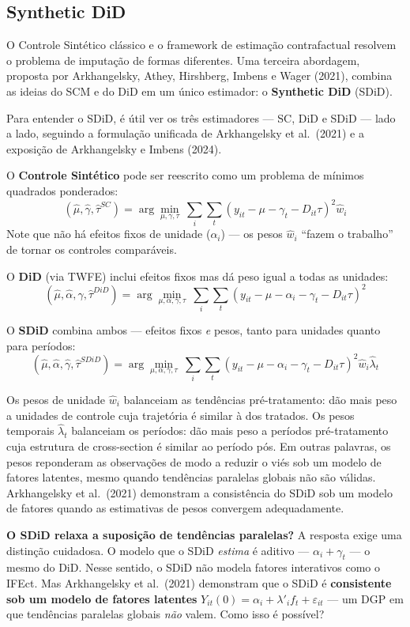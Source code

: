 \documentclass[
]{article}
\begin{document}
\subsection{Synthetic DiD}\label{synthetic-did}

O Controle Sintético clássico e o framework de estimação contrafactual resolvem o problema de imputação de formas diferentes. Uma terceira abordagem, proposta por Arkhangelsky, Athey, Hirshberg, Imbens e Wager (2021), combina as ideias do SCM e do DiD em um único estimador: o \textbf{Synthetic DiD} (SDiD).

Para entender o SDiD, é útil ver os três estimadores --- SC, DiD e SDiD --- lado a lado, seguindo a formulação unificada de Arkhangelsky et al.~(2021) e a exposição de Arkhangelsky e Imbens (2024).

O \textbf{Controle Sintético} pode ser reescrito como um problema de mínimos quadrados ponderados:
\[
(\hat{\mu}, \hat{\gamma}, \hat{\tau}^{SC}) = \arg\min_{\mu, \gamma, \tau}\ \sum_i \sum_t (y_{it} - \mu - \gamma_t - D_{it}\tau)^2 \hat{w}_i
\]
Note que não há efeitos fixos de unidade (\(\alpha_i\)) --- os pesos \(\hat{w}_i\) ``fazem o trabalho'' de tornar os controles comparáveis.

O \textbf{DiD} (via TWFE) inclui efeitos fixos mas dá peso igual a todas as unidades:
\[
(\hat{\mu}, \hat{\alpha}, \hat{\gamma}, \hat{\tau}^{DiD}) = \arg\min_{\mu, \alpha, \gamma, \tau}\ \sum_i \sum_t (y_{it} - \mu - \alpha_i - \gamma_t - D_{it}\tau)^2
\]

O \textbf{SDiD} combina ambos --- efeitos fixos \emph{e} pesos, tanto para unidades quanto para períodos:
\[
(\hat{\mu}, \hat{\alpha}, \hat{\gamma}, \hat{\tau}^{SDiD}) = \arg\min_{\mu, \alpha, \gamma, \tau}\ \sum_i \sum_t (y_{it} - \mu - \alpha_i - \gamma_t - D_{it}\tau)^2 \hat{w}_i \hat{\lambda}_t
\]

Os pesos de unidade \(\hat{w}_i\) balanceiam as tendências pré-tratamento: dão mais peso a unidades de controle cuja trajetória é similar à dos tratados. Os pesos temporais \(\hat{\lambda}_t\) balanceiam os períodos: dão mais peso a períodos pré-tratamento cuja estrutura de cross-section é similar ao período pós. Em outras palavras, os pesos reponderam as observações de modo a reduzir o viés sob um modelo de fatores latentes, mesmo quando tendências paralelas globais não são válidas. Arkhangelsky et al.~(2021) demonstram a consistência do SDiD sob um modelo de fatores quando as estimativas de pesos convergem adequadamente.

\textbf{O SDiD relaxa a suposição de tendências paralelas?} A resposta exige uma distinção cuidadosa. O modelo que o SDiD \emph{estima} é aditivo --- \(\alpha_i + \gamma_t\) --- o mesmo do DiD. Nesse sentido, o SDiD não modela fatores interativos como o IFEct. Mas Arkhangelsky et al.~(2021) demonstram que o SDiD é \textbf{consistente sob um modelo de fatores latentes} \(Y_{it}(0) = \alpha_i + \lambda'_i f_t + \varepsilon_{it}\) --- um DGP em que tendências paralelas globais \emph{não} valem. Como isso é possível?
\end{document}
